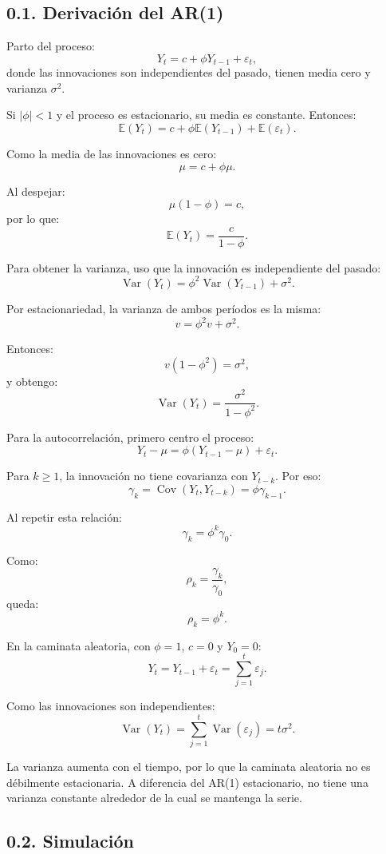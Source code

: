 \documentclass[11pt,letterpaper]{article}
\begin{document}
\subsection*{0.1. Derivación del AR(1)}

Parto del proceso:
\[
Y_t=c+\phi Y_{t-1}+\varepsilon_t,
\]
donde las innovaciones son independientes del pasado, tienen media cero y varianza $\sigma^2$.

Si $|\phi|<1$ y el proceso es estacionario, su media es constante. Entonces:
\[
\mathbb{E}(Y_t)
=
c+\phi\mathbb{E}(Y_{t-1})
+\mathbb{E}(\varepsilon_t).
\]

Como la media de las innovaciones es cero:
\[
\mu=c+\phi\mu.
\]

Al despejar:
\[
\mu(1-\phi)=c,
\]
por lo que:
\[
\boxed{\mathbb{E}(Y_t)=\frac{c}{1-\phi}}.
\]

Para obtener la varianza, uso que la innovación es independiente del pasado:
\[
\operatorname{Var}(Y_t)
=
\phi^2\operatorname{Var}(Y_{t-1})+\sigma^2.
\]

Por estacionariedad, la varianza de ambos períodos es la misma:
\[
v=\phi^2v+\sigma^2.
\]

Entonces:
\[
v(1-\phi^2)=\sigma^2,
\]
y obtengo:
\[
\boxed{\operatorname{Var}(Y_t)=\frac{\sigma^2}{1-\phi^2}}.
\]

Para la autocorrelación, primero centro el proceso:
\[
Y_t-\mu=\phi(Y_{t-1}-\mu)+\varepsilon_t.
\]

Para $k\geq1$, la innovación no tiene covarianza con $Y_{t-k}$. Por eso:
\[
\gamma_k
=
\operatorname{Cov}(Y_t,Y_{t-k})
=
\phi\gamma_{k-1}.
\]

Al repetir esta relación:
\[
\gamma_k=\phi^k\gamma_0.
\]

Como:
\[
\rho_k=\frac{\gamma_k}{\gamma_0},
\]
queda:
\[
\boxed{\rho_k=\phi^k}.
\]

En la caminata aleatoria, con $\phi=1$, $c=0$ y $Y_0=0$:
\[
Y_t=Y_{t-1}+\varepsilon_t
=
\sum_{j=1}^{t}\varepsilon_j.
\]

Como las innovaciones son independientes:
\[
\operatorname{Var}(Y_t)
=
\sum_{j=1}^{t}\operatorname{Var}(\varepsilon_j)
=
\boxed{t\sigma^2}.
\]

La varianza aumenta con el tiempo, por lo que la caminata aleatoria no es débilmente estacionaria. A diferencia del AR(1) estacionario, no tiene una varianza constante alrededor de la cual se mantenga la serie.

\subsection*{0.2. Simulación}
\end{document}
